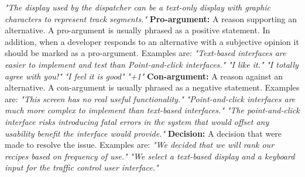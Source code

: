 \documentclass[a4paper,12pt,twoside]{report}
\begin{document}
\textit{"The display used by the dispatcher can be a text-only display with graphic characters to represent track segments."}
\newline \newline
\textbf{Pro-argument:} A reason supporting an alternative. A pro-argument is usually phrased as a positive statement. In addition, when a developer responds to an alternative with a subjective opinion it should be marked as a pro-argument.  Examples are:
\newline \newline
\textit{"Text-based interfaces are easier to implement and test than Point-and-click interfaces."}
\newline \newline
\textit{"I like it."}
\newline \newline
\textit{"I totally agree with you!"}
\newline \newline
\textit{"I feel it is good"}
\newline \newline
\textit{"+1"}
\newline \newline
\textbf{Con-argument:} A reason against an alternative. A con-argument is usually phrased as a negative statement. Examples are:
\newline \newline
\textit{"This screen has no real useful functionality."}
\newline \newline
\textit{"Point-and-click interfaces are much more complex to implement than text-based interfaces."}
\newline \newline
\textit{"The point-and-click interface risks introducing fatal errors in the system that would offset any usability benefit the interface would provide."}
\newline \newline
\textbf{Decision:} A decision that were made to resolve the issue. Examples are:
\newline \newline
\textit{"We decided that we will rank our recipes based on frequency of use."}
\newline \newline 
\textit{"We select a text-based display and a keyboard input for the traffic control user interface."}
\end{document}
